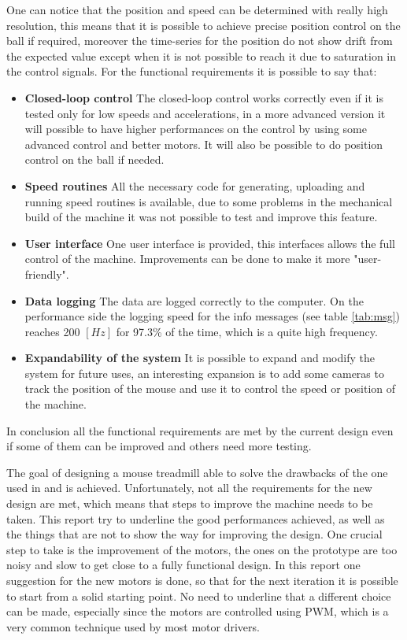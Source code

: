 \documentclass[12pt,a4paper, twoside]{article}
\begin{document}
\noindent
One can notice that the position and speed can be determined with really high resolution, this means that it is possible to achieve precise position control on the ball if required, moreover the time-series for the position do not show drift from the expected value except when it is not possible to reach it due to saturation in the control signals.
For the functional requirements it is possible to say that:
\begin{itemize}
	\item \textbf{Closed-loop control} The closed-loop control works correctly even if it is tested only for low speeds and accelerations, in a more advanced version it will possible to have higher performances on the control by using some advanced control and better motors. It will also be possible to do position control on the ball if needed.
	
	\item \textbf{Speed routines} All the necessary code for generating, uploading and running speed routines is available, due to some problems in the mechanical build of the machine it was not possible to test and improve this feature.
	
	\item \textbf{User interface} One user interface is provided, this interfaces allows the full control of the machine. Improvements can be done to make it more "user-friendly".
	
	\item \textbf{Data logging} The data are logged correctly to the computer. On the performance side the logging speed for the info messages (see table \ref{tab:msg}) reaches 200 $[Hz]$ for 97.3\% of the time, which is a quite high frequency.
	
	\item \textbf{Expandability of the system} It is possible to expand and modify the system for future uses, an interesting expansion is to add some cameras to track the position of the mouse and use it to control the speed or position of the machine.
\end{itemize}
In conclusion all the functional requirements are met by the current design even if some of them can be improved and others need more testing.
\newline

The goal of designing a mouse treadmill able to solve the drawbacks of the one used in \cite{Ole} and \cite{Neuron} is achieved. Unfortunately, not all the requirements for the new design are met, which means that steps to improve the machine needs to be taken. This report try to underline the good performances achieved, as well as the things that are not to show the way for improving the design.
One crucial step to take is the improvement of the motors, the ones on the prototype are too noisy and slow to get close to a fully functional design. In this report one suggestion for the new motors is done, so that for the next iteration it is possible to start from a solid starting point. No need to underline that a different choice can be made, especially since the motors are controlled using PWM, which is a very common technique used by most motor drivers.
\end{document}
